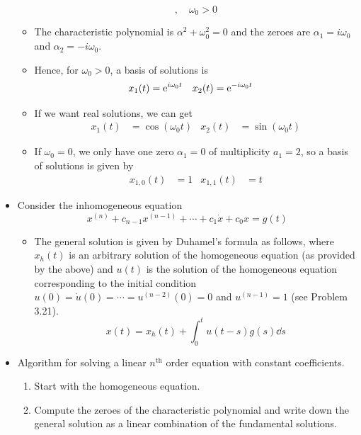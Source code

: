 \documentclass[../notes.tex]{subfiles}
\begin{document}
\begin{itemize}
\begin{itemize}
\begin{equation*}
            ,\quad
            \omega_0 > 0
        \end{equation*}
        \item The characteristic polynomial is $\alpha^2+\omega_0^2=0$ and the zeroes are $\alpha_1=i\omega_0$ and $\alpha_2=-i\omega_0$.
        \item Hence, for $\omega_0>0$, a basis of solutions is
        \begin{align*}
            x_1(t) &= \e[i\omega_0t]&
            x_2(t) &= \e[-i\omega_0t]
        \end{align*}
        \item If we want real solutions, we can get
        \begin{align*}
            x_1(t) &= \cos(\omega_0t)&
            x_2(t) &= \sin(\omega_0t)
        \end{align*}
        \item If $\omega_0=0$, we only have one zero $\alpha_1=0$ of multiplicity $a_1=2$, so a basis of solutions is given by
        \begin{align*}
            x_{1,0}(t) &= 1&
            x_{1,1}(t) &= t
        \end{align*}
    \end{itemize}
    \item Consider the inhomogeneous equation
    \begin{equation*}
        x^{(n)}+c_{n-1}x^{(n-1)}+\cdots+c_1\dot{x}+c_0x = g(t)
    \end{equation*}
    \begin{itemize}
        \item The general solution is given by Duhamel's formula as follows, where $x_h(t)$ is an arbitrary solution of the homogeneous equation (as provided by the above) and $u(t)$ is the solution of the homogeneous equation corresponding to the initial condition $u(0)=\dot{u}(0)=\cdots=u^{(n-2)}(0)=0$ and $u^{(n-1)}=1$ (see Problem 3.21).
        \begin{equation*}
            x(t) = x_h(t)+\int_0^tu(t-s)g(s)\dd{s}
        \end{equation*}
    \end{itemize}
    \item Algorithm for solving a linear $n^\text{th}$ order equation with constant coefficients.
    \begin{enumerate}
        \item Start with the homogeneous equation.
        \item Compute the zeroes of the characteristic polynomial and write down the general solution as a linear combination of the fundamental solutions.

\end{enumerate}
\end{itemize}
\end{document}
